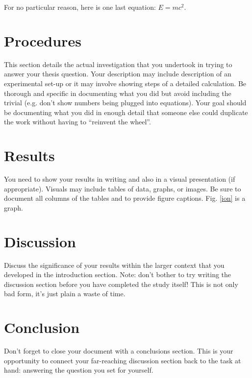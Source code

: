 \documentclass[twocolumn,12pt]{article}
\begin{document}
For no particular reason, here is one last equation:
$ E = mc^2$.

\section{Procedures}
This section details the actual investigation that you undertook in trying to answer your thesis question.  Your description may include description of an experimental set-up or it may involve showing steps of a detailed calculation.  Be thorough and specific in documenting what you did but avoid including the trivial (e.g. don't show numbers being plugged into equations).  Your goal should be documenting what you did in enough detail that someone else could duplicate the work without having to ``reinvent the wheel''. 

\section{Results}
You need to show your results in writing and also in a visual presentation (if appropriate).  Visuals may include tables of data, graphs, or images.  Be sure to document all columns of the tables and to provide figure captions.  Fig. \ref{ion} is a graph.



\section{Discussion}
Discuss the significance of your results within the larger context that you developed in the introduction section.  Note:  don't bother to try writing the discussion section before you have completed the study itself!  This is not only bad form, it's just plain a waste of time.


\section{Conclusion}
Don't forget to close your document with a conclusions section.  This is your opportunity to connect your far-reaching discussion section back to the task at hand:  answering the question you set for yourself.
\end{document}
